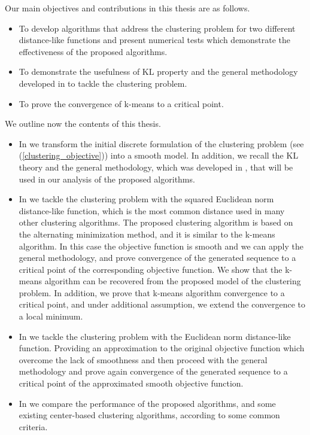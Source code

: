 Our main objectives and contributions in this thesis are as follows.
\begin{itemize}
	\item To develop algorithms that address the clustering problem for two different distance-like functions and present numerical tests which demonstrate the effectiveness of the proposed algorithms.
	
	\item To demonstrate the usefulness of KL property and the general methodology developed in \cite{BST2014} to tackle the clustering problem. %
  
	\item To prove the convergence of k-means to a critical point.
\end{itemize}

We outline now the contents of this thesis.
\begin{itemize}
	\item In  we transform the initial discrete formulation  of the clustering problem (see (\ref{clustering_objective})) into a smooth model. In addition, we recall the KL theory and the general methodology, which was developed in \cite{BST2014}, that will be used in our analysis of the proposed algorithms.
	\item In  we tackle the clustering problem with the squared Euclidean norm distance-like function, which is the most common distance used in many other clustering algorithms. The proposed clustering algorithm is based on the alternating minimization method, and it is similar to the k-means algorithm. In this case the objective function is smooth and we can apply the general methodology, and prove convergence of the generated sequence to a critical point of the corresponding objective function. We show that the k-means algorithm can be recovered from the proposed model of the clustering problem. In addition, we prove that k-means algorithm convergence to a critical point, and under additional assumption, we extend the convergence to a local minimum.
	\item In  we tackle the clustering problem with the Euclidean norm distance-like function. Providing an approximation to the original objective function which overcome the lack of smoothness and then proceed with the general methodology and prove again convergence of the generated sequence to a critical point of the approximated smooth objective function.
	\item In  we compare the performance of the proposed algorithms, and some existing center-based clustering algorithms, according to some common criteria.
\end{itemize}

